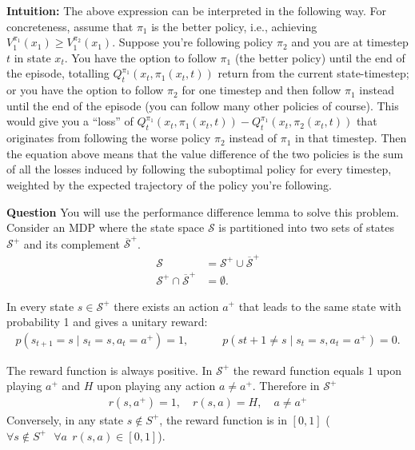 \documentclass[11pt]{article}
\begin{document}
\textbf{Intuition:} The above expression can be interpreted in the following way. For concreteness, assume that $\pi_1$ is the better policy, i.e., achieving $V_1^{\pi_1}(x_1) \geq V_1^{\pi_2}(x_1)$. Suppose you're following policy $\pi_2$ and you are at timestep $t$ in state $x_t$. 
You have the option to follow $\pi_1$ (the better policy) until the end of the episode, totalling $Q_t^{\pi_1}(x_t,\pi_1(x_t,t))$ return from the current state-timestep; or you have the option to follow $\pi_2$ for one timestep and then follow $\pi_1$ instead until the end of the episode (you can follow many other policies of course). This would give you a ``loss'' of $Q_t^{\pi_1}(x_t,\pi_1(x_t,t)) - Q_t^{\pi_1}(x_t,\pi_2(x_t,t))$ that originates from following the worse policy $\pi_2$ instead of $\pi_1$ in that timestep. 
Then the equation above
means that the value difference of the two policies is the sum of all the losses induced by following the suboptimal policy for every timestep, weighted by the expected trajectory of the policy you're following.

\textbf{Question}
You will use the performance difference lemma to solve this problem. Consider an MDP where the state space $\mathcal S$ is partitioned into two sets of states $\mathcal S^+$ and its complement $\overline{\mathcal S}^+$.
\begin{align}
\mathcal S & = \mathcal S^+ \cup \overline{\mathcal S}^+ \\
\mathcal S^+ \cap \overline{\mathcal S}^+ & = \emptyset.
\end{align}

In every state $s \in \mathcal S^+$ there exists an action $a^+$ that leads to the same state with probability 1 and gives a unitary reward:
\begin{align}
    p(s_{t+1} = s \mid s_{t} =s,a_t=a^+) = 1, \quad \quad \quad p(s{t+1} \neq s \mid s_{t} =s,a_t=a^+) = 0.
\end{align}

The reward function is always positive. In $\mathcal S^+$ the reward function equals $1$ upon playing $a^+$ and $H$ upon playing any action $a \neq a^+$.  Therefore in $ \mathcal S^+$
\begin{align}
    r(s,a^+) = 1, \quad   r(s,a) = H, \quad  a \neq a^+
\end{align}
Conversely, in any state $s \not \in S^+$, the reward function is in $[0,1]$ ($\forall s \not \in S^+ \ \ \ \forall a \ \ r(s,a) \in [0,1]$).
\end{document}
